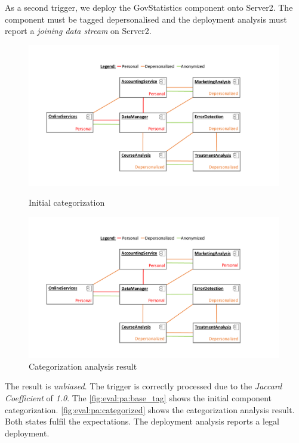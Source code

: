 As a second trigger, we deploy the GovStatistics component onto Server2. The component must be tagged depersonalised and the deployment analysis must report a \textit{joining data stream} on Server2.

\begin{figure}[h]
	\centering
	\begin{minipage}[b]{0.48\textwidth}		
		\includegraphics[trim = 20mm 10mm 40mm 10mm, clip, width=0.99\textwidth]{graphs/medSys_eval_pa_tagging_init}
		\caption{Initial categorization}
		\label{fig:eval:pa:base_tag}
	\end{minipage}
	\begin{minipage}[b]{0.48\textwidth}
		\includegraphics[trim = 20mm 10mm 40mm 10mm, clip, width=0.99\textwidth]{graphs/medSys_eval_pa_tagging_analysis}
		\caption{Categorization analysis result}
		\label{fig:eval:pa:categorized}
	\end{minipage}
\end{figure}

The result is \textit{unbiased}. The trigger is correctly processed due to the \textit{Jaccard Coefficient} of \textit{1.0}. The \autoref{fig:eval:pa:base_tag} shows the initial component categorization. \autoref{fig:eval:pa:categorized} shows the categorization analysis result. Both states fulfil the expectations. The deployment analysis reports a legal deployment.

